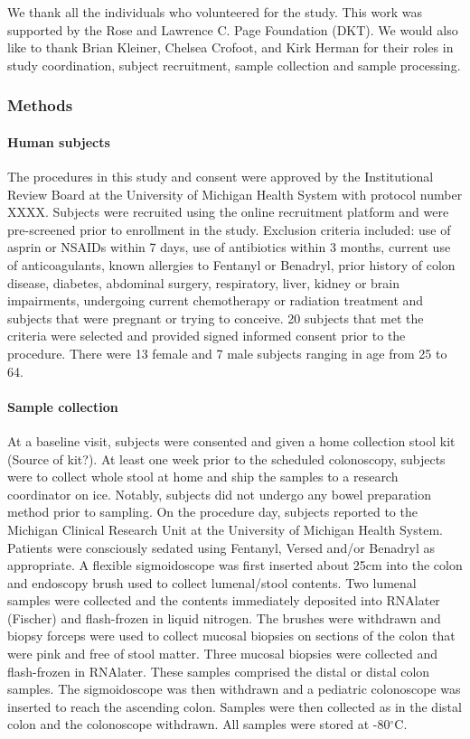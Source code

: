 \documentclass[11pt,]{article}
\let\oldparagraph\paragraph
\renewcommand{\paragraph}[1]{\oldparagraph{#1}\mbox{}}
\begin{document}
We thank all the individuals who volunteered for the study. This work
was supported by the Rose and Lawrence C. Page Foundation (DKT). We
would also like to thank Brian Kleiner, Chelsea Crofoot, and Kirk Herman
for their roles in study coordination, subject recruitment, sample
collection and sample processing.

\subsubsection{Methods}\label{methods}

\paragraph{Human subjects}\label{human-subjects}

The procedures in this study and consent were approved by the
Institutional Review Board at the University of Michigan Health System
with protocol number XXXX. Subjects were recruited using the online
recruitment platform and were pre-screened prior to enrollment in the
study. Exclusion criteria included: use of asprin or NSAIDs within 7
days, use of antibiotics within 3 months, current use of anticoagulants,
known allergies to Fentanyl or Benadryl, prior history of colon disease,
diabetes, abdominal surgery, respiratory, liver, kidney or brain
impairments, undergoing current chemotherapy or radiation treatment and
subjects that were pregnant or trying to conceive. 20 subjects that met
the criteria were selected and provided signed informed consent prior to
the procedure. There were 13 female and 7 male subjects ranging in age
from 25 to 64.

\paragraph{Sample collection}\label{sample-collection}

At a baseline visit, subjects were consented and given a home collection
stool kit (Source of kit?). At least one week prior to the scheduled
colonoscopy, subjects were to collect whole stool at home and ship the
samples to a research coordinator on ice. Notably, subjects did not
undergo any bowel preparation method prior to sampling. On the procedure
day, subjects reported to the Michigan Clinical Research Unit at the
University of Michigan Health System. Patients were consciously sedated
using Fentanyl, Versed and/or Benadryl as appropriate. A flexible
sigmoidoscope was first inserted about 25cm into the colon and endoscopy
brush used to collect lumenal/stool contents. Two lumenal samples were
collected and the contents immediately deposited into RNAlater (Fischer)
and flash-frozen in liquid nitrogen. The brushes were withdrawn and
biopsy forceps were used to collect mucosal biopsies on sections of the
colon that were pink and free of stool matter. Three mucosal biopsies
were collected and flash-frozen in RNAlater. These samples comprised the
distal or distal colon samples. The sigmoidoscope was then withdrawn and
a pediatric colonoscope was inserted to reach the ascending colon.
Samples were then collected as in the distal colon and the colonoscope
withdrawn. All samples were stored at -80\(^\circ\)C.
\end{document}
